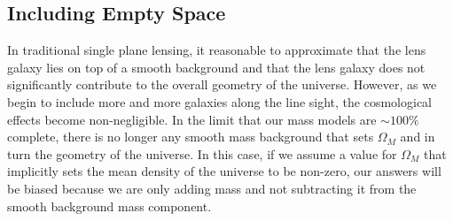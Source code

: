 \subsection{Including Empty Space}
In traditional single plane lensing, it reasonable to approximate that the lens galaxy lies on top of a smooth background and that the lens galaxy does not significantly contribute to the overall geometry of the universe. However, as we begin to include more and more galaxies along the line sight, the cosmological effects become non-negligible. In the limit that our mass models are $\sim100\%$ complete, there is no longer any smooth mass background that sets $\Omega_M$ and in turn the geometry of the universe. In this case, if we assume a value for $\Omega_M$ that implicitly sets the mean density of the universe to be non-zero, our answers will be biased because we are only adding mass and not subtracting it from the smooth background mass component. 

  